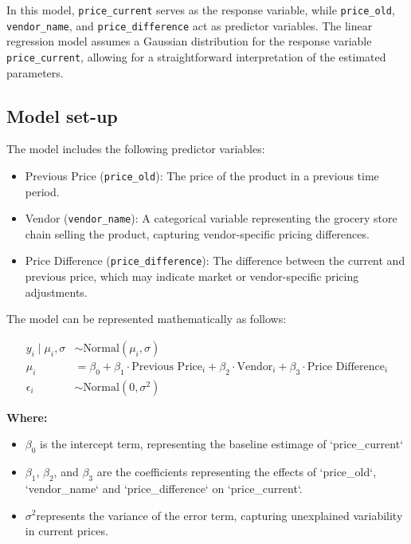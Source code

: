 \documentclass[
  letterpaper,
  DIV=11,
  numbers=noendperiod]{scrartcl}
\begin{document}
In this model, \texttt{price\_current} serves as the response variable,
while \texttt{price\_old}, \texttt{vendor\_name}, and
\texttt{price\_difference} act as predictor variables. The linear
regression model assumes a Gaussian distribution for the response
variable \texttt{price\_current}, allowing for a straightforward
interpretation of the estimated parameters.

\subsection{Model set-up}\label{model-set-up}

The model includes the following predictor variables:

\begin{itemize}
\item
  Previous Price (\texttt{price\_old}): The price of the product in a
  previous time period.
\item
  Vendor (\texttt{vendor\_name}): A categorical variable representing
  the grocery store chain selling the product, capturing vendor-specific
  pricing differences.
\item
  Price Difference (\texttt{price\_difference}): The difference between
  the current and previous price, which may indicate market or
  vendor-specific pricing adjustments.
\end{itemize}

The model can be represented mathematically as follows:

\begin{align*}
    y_i \mid \mu_i, \sigma &\sim \text{Normal}(\mu_i, \sigma) \\
    \mu_i &= \beta_0 + \beta_1 \cdot \text{Previous Price}_i + \beta_2 \cdot \text{Vendor}_i + \beta_3 \cdot \text{Price Difference}_i \\
    \epsilon_i &\sim \text{Normal}(0, \sigma^2)
\end{align*}

\textbf{Where:}

\begin{itemize}
    \item $\beta_0$ is the intercept term, representing the baseline estimage of `price_current`
    \item $\beta_1$, $\beta_2$, and $\beta_3$ are the coefficients representing the effects of `price_old`, `vendor_name` and `price_difference` on `price_current`.
    \item $\sigma^2$represents the variance of the error term, capturing unexplained variability in current prices.
\end{itemize}
\end{document}
